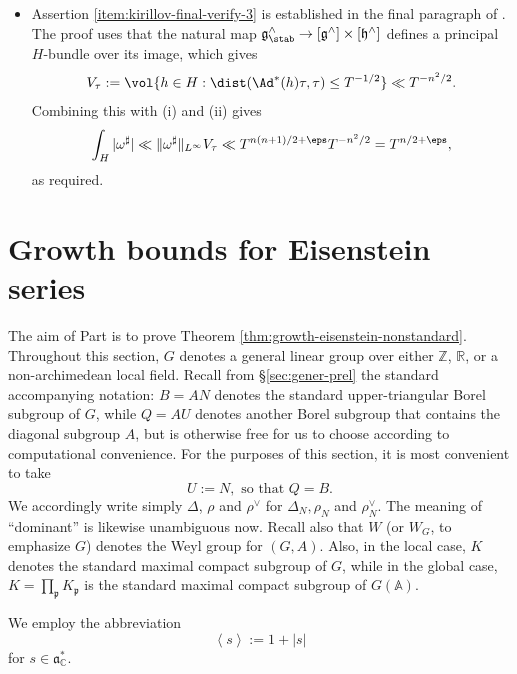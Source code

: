 \begin{itemize}
  \[
    \|\omega^\sharp\|_{L^\infty}
    \leq
    \sup_{g \in G}
    \int_Z |\omega(zg)| \, d z
    \ll
    \|\omega\|_{L^\infty}.
  \]
  The claimed bound follows.
\item Assertion \eqref{item:kirillov-final-verify-3} is established in the final paragraph of \cite[\S14.9]{2020arXiv201202187N}.  The proof uses that the natural map $\mathfrak{g}^\wedge_{\stab} \rightarrow [\mathfrak{g}^\wedge] \times [\mathfrak{h}^\wedge]$ defines a principal $H$-bundle over its image, which gives
  \begin{equation*}
    V_\tau := \vol\{h \in H : \dist(\Ad^*(h)\tau,\tau) \leq T^{-1/2}\} \ll T^{-n^2/2}.
  \end{equation*}
  Combining this with (i) and (ii) gives
  \[
    \int_H |\omega^\sharp|
    \ll
    \|\omega^\sharp\|_{L^\infty}
    V_\tau \ll T^{n(n+1)/2+\eps} T^{-n^2/2}
    = T^{n/2+\eps},
  \]
  as required.
\end{itemize}

\part{Growth bounds for Eisenstein series}\label{part:local-l2-growth}
The aim of Part \ref{part:local-l2-growth} is to prove Theorem \ref{thm:growth-eisenstein-nonstandard}.  Throughout this section, $G$ denotes a general linear group over either $\mathbb{Z}$, $\mathbb{R}$, or a non-archimedean local field.  Recall from \S\ref{sec:gener-prel} the standard accompanying notation: $B = A N$ denotes the standard upper-triangular Borel subgroup of $G$, while $Q = A U$ denotes another Borel subgroup that contains the diagonal subgroup $A$, but is otherwise free for us to choose according to computational convenience.  For the purposes of this section, it is most convenient to take
\begin{equation*}
  U := N, \text{ so that } Q = B.
\end{equation*}
We accordingly write simply $\Delta$, $\rho$ and $\rho^\vee$ for $\Delta_N, \rho_N$ and $\rho_N^\vee$.  The meaning of ``dominant'' is likewise unambiguous now.  Recall also that $W$ (or $W_G$, to emphasize $G$) denotes the Weyl group for $(G,A)$.  Also, in the local case, $K$ denotes the standard maximal compact subgroup of $G$, while in the global case, $K = \prod_\mathfrak{p} K_\mathfrak{p}$ is the standard maximal compact subgroup of $G(\mathbb{A})$.

We employ the abbreviation
\begin{equation*}
  \left\langle s \right\rangle := 1 + |s|
\end{equation*}
for $s \in \mathfrak{a}_{\mathbb{C}}^*$.

